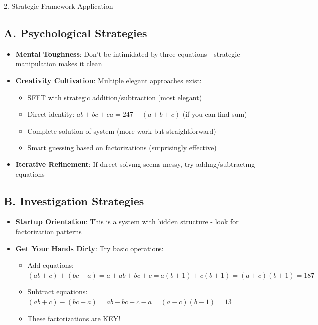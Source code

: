 \documentclass[12pt]{article}
\begin{document}
\begin{strategybox}{2. Strategic Framework Application}

\subsection*{A. Psychological Strategies}
\begin{itemize}[leftmargin=*]
    \item \textbf{Mental Toughness}: Don't be intimidated by three equations - strategic manipulation makes it clean
    
    \item \textbf{Creativity Cultivation}: Multiple elegant approaches exist:
    \begin{itemize}
        \item SFFT with strategic addition/subtraction (most elegant)
        \item Direct identity: $ab+bc+ca = 247 - (a+b+c)$ (if you can find sum)
        \item Complete solution of system (more work but straightforward)
        \item Smart guessing based on factorizations (surprisingly effective)
    \end{itemize}
    
    \item \textbf{Iterative Refinement}: If direct solving seems messy, try adding/subtracting equations
\end{itemize}

\subsection*{B. Investigation Strategies}
\begin{itemize}[leftmargin=*]
    \item \textbf{Startup Orientation}: This is a system with hidden structure - look for factorization patterns
    
    \item \textbf{Get Your Hands Dirty}: Try basic operations:
    \begin{itemize}
        \item Add equations: $(ab+c) + (bc+a) = a + ab + bc + c = a(b+1) + c(b+1) = (a+c)(b+1) = 187$
        \item Subtract equations: $(ab+c) - (bc+a) = ab - bc + c - a = (a-c)(b-1) = 13$
        \item These factorizations are KEY!
    \end{itemize}
    

\end{itemize}
\end{strategybox}
\end{document}
